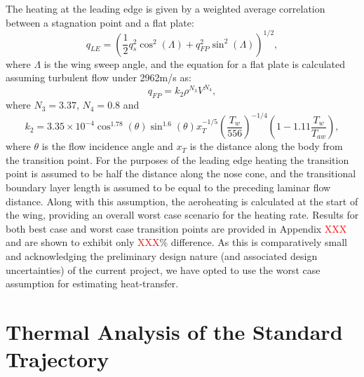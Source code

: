 The heating at the leading edge is given by a weighted average correlation between a stagnation point and a flat plate\cite{Dirkx,Tauber2008}:
\begin{equation}
q_{LE} = (\frac{1}{2}q_s^2 \cos^2(\Lambda) + q_{FP}^2 \sin^2(\Lambda))^{1/2},
\end{equation}
where $\Lambda$ is the wing sweep angle, and the equation for a flat plate is calculated assuming turbulent flow under 2962m/s as:
\begin{equation}
q_{FP} = k_2\rho^{N_3}V^{N_4},
\end{equation}
where $N_3 = 3.37$, $N_4 = 0.8$ and
\begin{equation}
k_2 = 3.35 \times 10^{-4} \cos^{1.78}(\theta) \sin^{1.6}(\theta) x_T^{-1/5} (\frac{T_w}{556})^{-1/4} (1 - 1.11\frac{T_w}{T_{aw}}),
\end{equation}
where $\theta$ is the flow incidence angle and $x_T$ is the distance along the body from the transition point\cite{Dirkx,Tauber2008}. For the purposes of the leading edge heating the transition point is assumed to be half the distance along the nose cone, and the transitional boundary layer length is assumed to be equal to the preceding laminar flow distance. Along with this assumption, the aeroheating is calculated at the start of the wing, providing an overall worst case scenario for the heating rate. Results for both best case and worst case transition points are provided in Appendix \textcolor{red}{XXX} and are shown to exhibit only \textcolor{red}{XXX}\% difference. As this is comparatively small and acknowledging the preliminary design nature (and associated design uncertainties) of the current project, we have opted to use the worst case assumption for estimating heat-transfer.





\section{Thermal Analysis of the Standard Trajectory}
 

